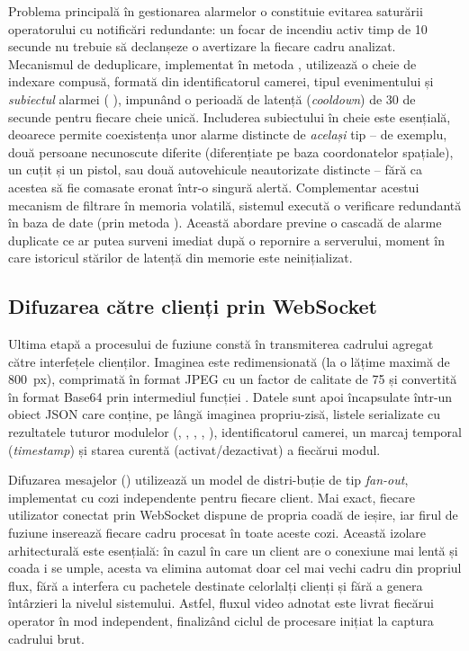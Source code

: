 \documentclass[../../main.tex]{subfiles}
\begin{document}
Problema principală în gestionarea alarmelor o constituie evitarea saturării operatorului cu notificări redundante: un focar de incendiu activ timp de 10 secunde nu trebuie să declanșeze o avertizare la fiecare cadru analizat. Mecanismul de deduplicare, implementat în metoda , utilizează o cheie de indexare compusă, formată din identificatorul camerei, tipul evenimentului și \textit{subiectul} alarmei ( \linebreak {}), impunând o perioadă de latență (\textit{cooldown}) de 30 de secunde pentru fiecare cheie unică. Includerea subiectului în cheie este esențială, deoarece permite coexistența unor alarme distincte de \textit{același} tip -- de exemplu, două persoane necunoscute diferite (diferențiate pe baza coordonatelor spațiale), un cuțit și un pistol, sau două autovehicule neautorizate distincte -- fără ca acestea să fie comasate eronat într-o singură alertă. Complementar acestui mecanism de filtrare în memoria volatilă, sistemul execută o verificare redundantă în baza de date (prin metoda ). Această abordare previne o cascadă de alarme duplicate ce ar putea surveni imediat după o repornire a serverului, moment în care istoricul stărilor de latență din memorie este neinițializat.

\subsection{Difuzarea către clienți prin WebSocket}
\label{subsec:difuzare}

Ultima etapă a procesului de fuziune constă în transmiterea cadrului agregat către interfețele clienților. Imaginea  este redimensionată (la o lățime maximă de 800~px), comprimată în format JPEG cu un factor de calitate de 75 și convertită în format Base64 prin intermediul funcției  . Datele sunt apoi încapsulate într-un obiect JSON care conține, pe lângă imaginea propriu-zisă, listele serializate cu rezultatele tuturor modulelor (, , , ,  ), identificatorul camerei, un marcaj temporal (\textit{timestamp}) și starea curentă (activat/dezactivat) a fiecărui modul.

Difuzarea mesajelor () utilizează un model de distri-buție de tip \textit{fan-out}, implementat cu cozi independente pentru fiecare client. Mai exact, fiecare utilizator conectat prin WebSocket dispune de propria coadă de ieșire, iar firul de fuziune inserează fiecare cadru procesat în toate aceste cozi. Această izolare arhitecturală este esențială: în cazul în care un client are o conexiune mai lentă și coada i se umple, acesta va elimina automat doar cel mai vechi cadru din propriul flux, fără a interfera cu pachetele destinate celorlalți clienți și fără a genera întârzieri la nivelul sistemului. Astfel, fluxul video adnotat este livrat fiecărui operator în mod independent, finalizând ciclul de procesare inițiat la captura cadrului brut.
\end{document}

